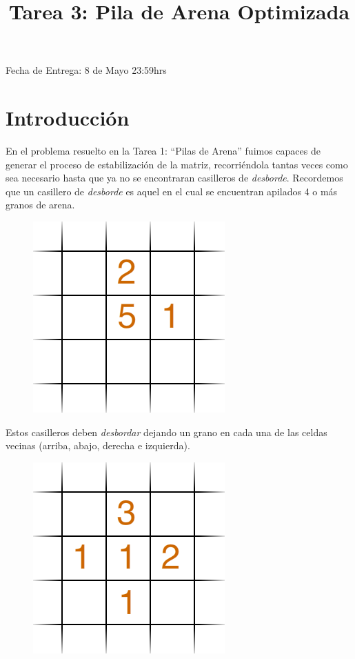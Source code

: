 \documentclass[dcc]{fcfmcourse}
\title{Tarea 3: Pila de Arena Optimizada}
\begin{document}
\maketitle
\vspace{-2ex}
\begin{center}
Fecha de Entrega: 8 de Mayo  23:59hrs \\
\end{center}


\section{Introducción}

En el problema resuelto en la Tarea 1: ``Pilas de Arena'' fuimos capaces de generar el proceso de estabilización de la matriz, recorriéndola tantas veces como sea necesario hasta que ya no se encontraran casilleros de \textit{desborde}. Recordemos que un casillero de \textit{desborde} es aquel en el cual se encuentran apilados 4 o más granos de arena.

\begin{figure}[!ht]
    \centering
    \includegraphics[scale=0.45]{imagenes/gridex1.png}
\end{figure}

Estos casilleros deben \textit{desbordar} dejando un grano en cada una de las celdas vecinas (arriba, abajo, derecha e izquierda).

\begin{figure}[!ht]
    \centering
    \includegraphics[scale=0.45]{imagenes/gridex2.png}
\end{figure}
\end{document}
